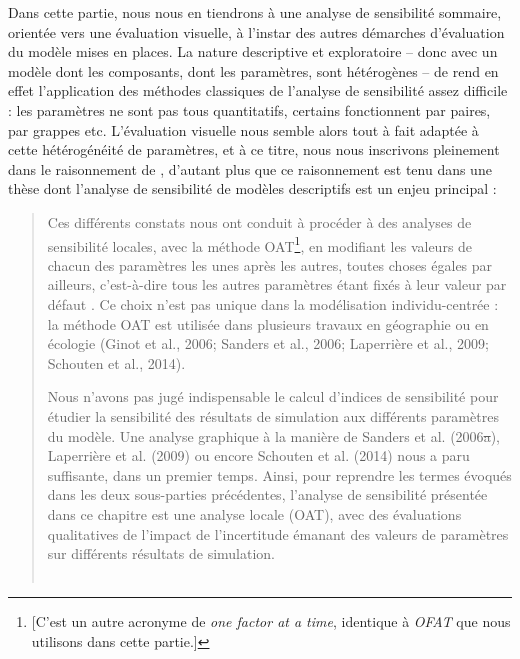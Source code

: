 Dans cette partie, nous nous en tiendrons à une analyse de sensibilité sommaire, orientée vers une évaluation visuelle, à l'instar des autres démarches d'évaluation du modèle mises en places.
La nature descriptive et exploratoire -- donc avec un modèle dont les composants, dont les paramètres, sont hétérogènes -- de \simfeodal{} rend en effet l'application des méthodes classiques de l'analyse de sensibilité assez difficile : les paramètres ne sont pas tous quantitatifs, certains fonctionnent par paires, par grappes etc.
L'évaluation visuelle nous semble alors tout à fait adaptée à cette hétérogénéité de paramètres, et à ce titre, nous nous inscrivons pleinement dans le raisonnement de , d'autant plus que ce raisonnement est tenu dans une thèse dont l'analyse de sensibilité de modèles descriptifs est un enjeu principal :
\begin{quotation}
	\og Ces différents constats nous ont conduit à procéder à des analyses de sensibilité locales, avec la méthode OAT\footnote{
		[C'est un autre acronyme de \og \textit{one factor at a time}\fg{}, identique à \textit{OFAT} que nous utilisons dans cette partie.]
	}, en modifiant les valeurs de chacun des paramètres les unes après les autres, toutes choses égales par ailleurs, c’est-à-dire tous les autres paramètres étant fixés à leur valeur par défaut \textelp{}.
	Ce choix n’est pas unique dans la modélisation individu-centrée : la méthode OAT est utilisée dans plusieurs travaux en géographie ou en écologie (Ginot et al., 2006; Sanders et al., 2006; Laperrière et al., 2009; Schouten et al., 2014).
	
	Nous n’avons pas jugé indispensable le calcul d’indices de sensibilité pour étudier la sensibilité des résultats de simulation aux différents paramètres du modèle.
	Une analyse graphique à la manière de Sanders et al. (2006\st{a}), Laperrière et al. (2009) ou encore Schouten et al. (2014) nous a paru suffisante, dans un premier temps.
	Ainsi, pour reprendre les termes évoqués dans les deux sous-parties précédentes, l’analyse de sensibilité présentée dans ce chapitre est une analyse locale (OAT), avec des évaluations qualitatives de l’impact de l’incertitude émanant des valeurs de paramètres sur différents résultats de simulation.\fg{}\\
	\mbox{}~ \hfill \cite[251-252]{hirtzel2015exploration}
\end{quotation}


